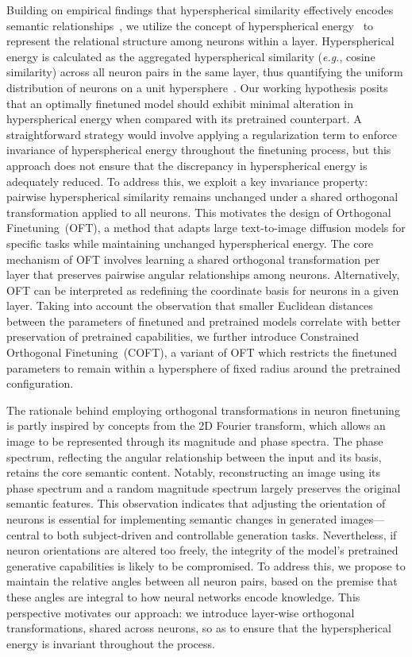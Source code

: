 Building on empirical findings that hyperspherical similarity effectively encodes semantic relationships~\cite{liu2017deep,liu2018decoupled,chen2020angular}, we utilize the concept of hyperspherical energy~\cite{liu2018learning} to represent the relational structure among neurons within a layer. Hyperspherical energy is calculated as the aggregated hyperspherical similarity (\emph{e.g.}, cosine similarity) across all neuron pairs in the same layer, thus quantifying the uniform distribution of neurons on a unit hypersphere~\cite{liu2021learning}. Our working hypothesis posits that an optimally finetuned model should exhibit minimal alteration in hyperspherical energy when compared with its pretrained counterpart. A straightforward strategy would involve applying a regularization term to enforce invariance of hyperspherical energy throughout the finetuning process, but this approach does not ensure that the discrepancy in hyperspherical energy is adequately reduced. To address this, we exploit a key invariance property: pairwise hyperspherical similarity remains unchanged under a shared orthogonal transformation applied to all neurons. This motivates the design of Orthogonal Finetuning~(OFT), a method that adapts large text-to-image diffusion models for specific tasks while maintaining unchanged hyperspherical energy. The core mechanism of OFT involves learning a shared orthogonal transformation per layer that preserves pairwise angular relationships among neurons. Alternatively, OFT can be interpreted as redefining the coordinate basis for neurons in a given layer. Taking into account the observation that smaller Euclidean distances between the parameters of finetuned and pretrained models correlate with better preservation of pretrained capabilities, we further introduce Constrained Orthogonal Finetuning~(COFT), a variant of OFT which restricts the finetuned parameters to remain within a hypersphere of fixed radius around the pretrained configuration.

The rationale behind employing orthogonal transformations in neuron finetuning is partly inspired by concepts from the 2D Fourier transform, which allows an image to be represented through its magnitude and phase spectra. The phase spectrum, reflecting the angular relationship between the input and its basis, retains the core semantic content. Notably, reconstructing an image using its phase spectrum and a random magnitude spectrum largely preserves the original semantic features. This observation indicates that adjusting the orientation of neurons is essential for implementing semantic changes in generated images—central to both subject-driven and controllable generation tasks. Nevertheless, if neuron orientations are altered too freely, the integrity of the model’s pretrained generative capabilities is likely to be compromised. To address this, we propose to maintain the relative angles between all neuron pairs, based on the premise that these angles are integral to how neural networks encode knowledge. This perspective motivates our approach: we introduce layer-wise orthogonal transformations, shared across neurons, so as to ensure that the hyperspherical energy is invariant throughout the process.

